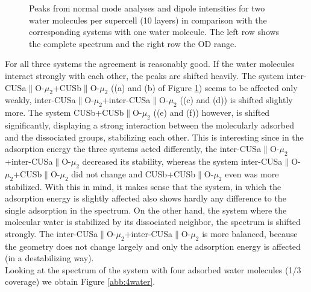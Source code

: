 \documentclass[11pt,DIV=13,BCOR=5mm,a4paper,headinclude]{scrbook}
\begin{document}
\begin{figure}[!h]
             \quad
{}
\caption{Peaks from normal mode analyses and dipole intensities for two water molecules per supercell (10 layers) in comparison with the corresponding systems with one water molecule.
The left row shows the complete spectrum and the right row the OD range.}
            \label{abb:2water_comp}
\end{figure}
For all three systems the agreement is reasonably good.
If the water molecules interact strongly with each other, the peaks are shifted heavily.
The system inter-CUSa$\parallel$O-$\mu_2$+CUSb$\parallel$O-$\mu_2$ ((a) and (b) of Figure \ref{abb:2water_comp}) seems to be affected only weakly, inter-CUSa$\parallel$O-$\mu_2$+inter-CUSa$\parallel$O-$\mu_2$ ((c) and (d)) is shifted slightly more.
The system CUSb+CUSb$\parallel$O-$\mu_2$ ((e) and (f)) however, is shifted  significantly, displaying a strong interaction between the molecularly adsorbed and the dissociated groups, stabilizing each other.
This is interesting since in the adsorption energy the three systems acted differently, the inter-CUSa$\parallel$O-$\mu_2$+inter-CUSa$\parallel$O-$\mu_2$ decreased its stability, whereas the system inter-CUSa$\parallel$O-$\mu_2$+CUSb$\parallel$O-$\mu_2$ did not change and CUSb+CUSb$\parallel$O-$\mu_2$ even was more stabilized.
With this in mind, it makes sense that the system, in which the adsorption energy is slightly affected also shows hardly any difference to the single adsorption in the spectrum.
On the other hand, the system where the molecular water is stabilized by its dissociated neighbor, the spectrum is shifted strongly.
The inter-CUSa$\parallel$O-$\mu_2$+inter-CUSa$\parallel$O-$\mu_2$ is more balanced, because the geometry does not change largely and only the adsorption energy is affected (in a destabilizing way).
\\
Looking at the spectrum of the system with four adsorbed water molecules (1/3 coverage) we obtain Figure \ref{abb:4water}.
\end{document}
